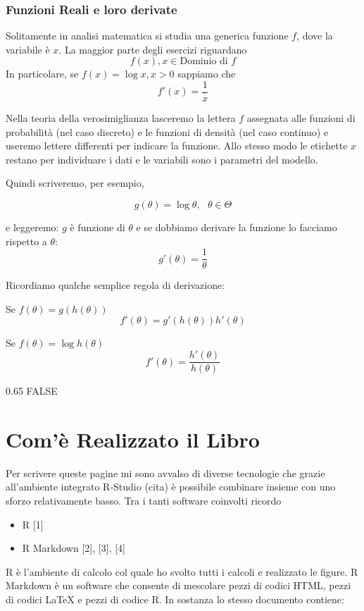 \documentclass[
  11pt,
]{book}
\providecommand{\tightlist}{%
  \setlength{\itemsep}{0pt}\setlength{\parskip}{0pt}}
\theoremstyle{mytheoremstyle}
\theoremstyle{mydefstyle}
\begin{document}
\subsection{Funzioni Reali e loro derivate}\label{funzioni-reali-e-loro-derivate}

Solitamente in analisi matematica si studia una generica funzione \(f\), dove la variabile è \(x\).
La maggior parte degli esercizi riguardano
\[
f(x), x\in\text{Dominio di $f$}
\]
In particolare, se \(f(x)=\log x, x>0\) sappiamo che
\[f'(x)=\frac{1}x\]

Nella teoria della verosimiglianza lasceremo la lettera \(f\) assegnata alle funzioni di
probabilità (nel caso discreto) e le funzioni di densità (nel caso continuo) e
useremo lettere differenti per indicare la funzione. Allo stesso modo le etichette \(x\)
restano per individuare i dati e le variabili sono i parametri del modello.

Quindi scriveremo, per esempio,

\[
g(\theta)=\log \theta,~~~ \theta\in\Theta
\]

e leggeremo: \(g\) è funzione di \(\theta\) e se dobbiamo derivare la funzione
lo facciamo rispetto a \(\theta\):
\[g'(\theta)=\frac{1}\theta\]

Ricordiamo qualche semplice regola di derivazione:

Se \(f(\theta)=g(h(\theta))\)
\[f'(\theta)=g'(h(\theta))h'(\theta)\]

Se \(f(\theta)=\log h(\theta)\)
\[f'(\theta)=\frac{h'(\theta)}{h(\theta)}\]

0.65 FALSE

\chapter{Com'è Realizzato il Libro}\label{comuxe8-realizzato-il-libro}

Per scrivere queste pagine mi sono avvalso di diverse tecnologie che grazie all'ambiente integrato
R-Studio (cita) è possibile combinare insieme con uno sforzo relativamente basso.
Tra i tanti software coinvolti ricordo

\begin{itemize}
\tightlist
\item
  R {[}1{]}
\item
  R Markdown {[}2{]}, {[}3{]}, {[}4{]}
\end{itemize}

R è l'ambiente di calcolo col quale ho svolto tutti i calcoli e realizzato le figure.
R Markdown è un software che consente di mescolare pezzi di codici HTML, pezzi di codici \LaTeX{}
e pezzi di codice R.
In sostanza lo stesso documento contiene:
\end{document}
